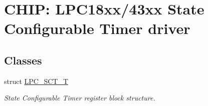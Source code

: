 \hypertarget{group___s_c_t__18_x_x__43_x_x}{}\section{C\+H\+IP\+: L\+P\+C18xx/43xx State Configurable Timer driver}
\label{group___s_c_t__18_x_x__43_x_x}
\subsection*{Classes}
\begin{DoxyCompactItemize}
\item 
struct \hyperlink{struct_l_p_c___s_c_t___t}{L\+P\+C\+\_\+\+S\+C\+T\+\_\+T}
\begin{DoxyCompactList}\small\item\em State Configurable Timer register block structure. \end{DoxyCompactList}\end{DoxyCompactItemize}
